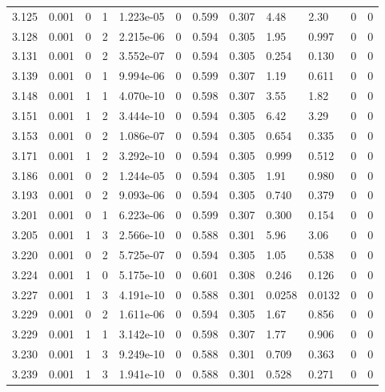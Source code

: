 \documentclass[preview]{standalone}
\begin{document}
{{{{{{{\begin{tabular}{L{1.2cm}C{1.2cm} C{0.3cm}C{0.5cm} C{1.4cm}C{1.4cm} C{1.4cm}C{1.4cm} C{1.6cm}C{1.6cm} C{1.6cm}C{1.6cm}}
  3.125  &  0.001  & 0     &  1 &  1.223e-05  & 0  &  0.599&   0.307& 4.48 & 2.30   &  0 & 0  \\ 
  3.128  &  0.001  & 0     &  2 &  2.215e-06  & 0  &  0.594&   0.305& 1.95 & 0.997   &  0 & 0  \\ 
  3.131  &  0.001  & 0     &  2 &  3.552e-07  & 0  &  0.594&   0.305& 0.254 & 0.130   &  0 & 0  \\ 
  3.139  &  0.001  & 0     &  1 &  9.994e-06  & 0  &  0.599&   0.307& 1.19 & 0.611   &  0 & 0  \\ 
  3.148  &  0.001  & 1     &  1 &  4.070e-10  & 0  &  0.598&   0.307& 3.55 & 1.82   &  0 & 0  \\ 
  3.151  &  0.001  & 1     &  2 &  3.444e-10  & 0  &  0.594&   0.305& 6.42 & 3.29   &  0 & 0  \\ 
  3.153  &  0.001  & 0     &  2 &  1.086e-07  & 0  &  0.594&   0.305& 0.654 & 0.335   &  0 & 0  \\ 
  3.171  &  0.001  & 1     &  2 &  3.292e-10  & 0  &  0.594&   0.305& 0.999 & 0.512   &  0 & 0  \\ 
  3.186  &  0.001  & 0     &  2 &  1.244e-05  & 0  &  0.594&   0.305& 1.91 & 0.980   &  0 & 0  \\ 
  3.193  &  0.001  & 0     &  2 &  9.093e-06  & 0  &  0.594&   0.305& 0.740 & 0.379   &  0 & 0  \\ 
  3.201  &  0.001  & 0     &  1 &  6.223e-06  & 0  &  0.599&   0.307& 0.300 & 0.154   &  0 & 0  \\ 
  3.205  &  0.001  & 1     &  3 &  2.566e-10  & 0  &  0.588&   0.301& 5.96 & 3.06   &  0 & 0  \\ 
  3.220  &  0.001  & 0     &  2 &  5.725e-07  & 0  &  0.594&   0.305& 1.05 & 0.538   &  0 & 0  \\ 
  3.224  &  0.001  & 1     &  0 &  5.175e-10  & 0  &  0.601&   0.308& 0.246 & 0.126   &  0 & 0  \\ 
  3.227  &  0.001  & 1     &  3 &  4.191e-10  & 0  &  0.588&   0.301& 0.0258 & 0.0132   &  0 & 0  \\ 
  3.229  &  0.001  & 0     &  2 &  1.611e-06  & 0  &  0.594&   0.305& 1.67 & 0.856   &  0 & 0  \\ 
  3.229  &  0.001  & 1     &  1 &  3.142e-10  & 0  &  0.598&   0.307& 1.77 & 0.906   &  0 & 0  \\ 
  3.230  &  0.001  & 1     &  3 &  9.249e-10  & 0  &  0.588&   0.301& 0.709 & 0.363   &  0 & 0  \\ 
  3.239  &  0.001  & 1     &  3 &  1.941e-10  & 0  &  0.588&   0.301& 0.528 & 0.271   &  0 & 0  \\ 

\end{tabular}}}}}}}}
\end{document}
